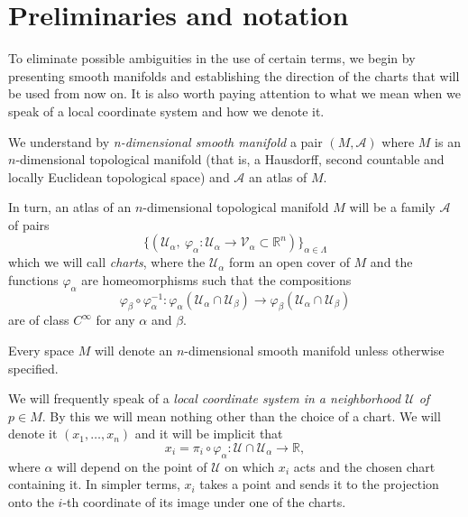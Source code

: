 \section{Preliminaries and notation}

To eliminate possible ambiguities in the use of certain terms, we begin by presenting smooth manifolds and establishing the direction of the charts that will be used from now on. It is also worth paying attention to what we mean when we speak of a local coordinate system and how we denote it.

We understand by \textit{n-dimensional smooth manifold} a pair $(M,\mathcal{A})$ where $M$ is an $n$-dimensional topological manifold (that is, a Hausdorff, second countable and locally Euclidean topological space) and $\mathcal{A}$ an atlas of $M$.

In turn, an atlas of an $n$-dimensional topological manifold $M$ will be a family $\mathcal{A}$ of pairs
\begin{equation*}
    \{(\mathcal{U}_{\alpha}, ~\varphi_{\alpha}:\mathcal{U}_{\alpha}\to \mathcal{V}_{\alpha}\subset\mathbb{R}^n)\}_{\alpha\in\Lambda}
\end{equation*}
which we will call \textit{charts}, where the $\mathcal{U}_{\alpha}$ form an open cover of $M$ and the functions $\varphi_{\alpha}$ are homeomorphisms such that the compositions
\begin{equation*}
    \varphi_\beta \circ \varphi_\alpha^{-1} : \varphi_\alpha (\mathcal{U}_\alpha \cap \mathcal{U}_\beta)\to \varphi_\beta (\mathcal{U}_\alpha \cap \mathcal{U}_\beta)
\end{equation*}
are of class $C^\infty$ for any $\alpha$ and $\beta$.

Every space $M$ will denote an $n$-dimensional smooth manifold unless otherwise specified.

\bigskip

We will frequently speak of a \textit{local coordinate system in a neighborhood $\mathcal{U}$ of $p\in M$}. By this we will mean nothing other than the choice of a chart. We will denote it $(x_{1}, \dots ,x_{n})$ and it will be implicit that
\begin{equation*}
    x_i = \pi_i \circ \varphi_{\alpha} : \mathcal{U}\cap\mathcal{U}_{\alpha} \to \mathbb{R},
\end{equation*}
where $\alpha$ will depend on the point of $\mathcal{U}$ on which $x_i$ acts and the chosen chart containing it. In simpler terms, $x_i$ takes a point and sends it to the projection onto the $i$-th coordinate of its image under one of the charts.

